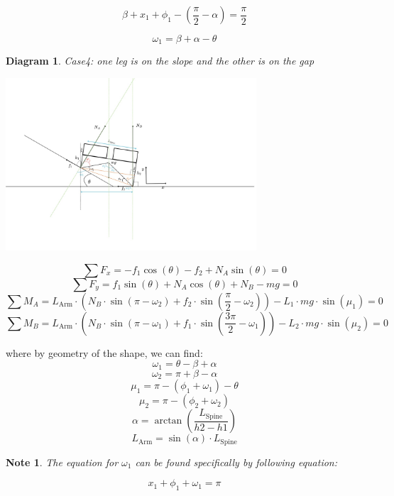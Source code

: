 \documentclass[11pt]{article}
\newtheorem{diagram}[statement]{Diagram}
\newtheorem{note}[statement]{Note}
\begin{document}
\begin{equation}
\beta + x_1 + \phi_1 - \left( \frac{\pi}{2} - \alpha \right) = \frac{\pi}{2}
\end{equation}

\begin{equation}
\omega_1 = \beta + \alpha - \theta
\tag*{From (1) and (2)}
\end{equation}

\begin{diagram}
    Case4: one leg is on the slope and the other is on the gap
\end{diagram}
\vspace{1ex} %
\begin{center}
    \includegraphics[width=0.7\textwidth]{figs/Case4.jpg} %
\end{center}

\[ \sum F_x = -f_1 \cos(\theta) -f_2 + N_A \sin(\theta)= 0 \]
\[ \sum F_y = f_1 \sin(\theta)+ N_A \cos(\theta) + N_B - mg = 0 \]
\[ \sum M_A =  L_\text{Arm} \cdot (N_B \cdot \sin(\pi-\omega_2) + f_2 \cdot \sin(\frac{\pi}{2}-\omega_2)) - L_1\cdot mg \cdot \sin(\mu_1)= 0 \]
\[ \sum M_B =  L_\text{Arm} \cdot (N_B \cdot \sin(\pi-\omega_1) + f_1 \cdot \sin(\frac{3\pi}{2}-\omega_1)) - L_2\cdot mg \cdot \sin(\mu_2)= 0 \]

where by geometry of the shape, we can find:
\[\omega_1 = \theta - \beta + \alpha\]
\[\omega_2 =  \pi + \beta - \alpha \]
\[\mu_1 = \pi-(\phi_1+\omega_1)-\theta \]
\[\mu_2 = \pi-(\phi_2+\omega_2) \]
\[\alpha = \arctan(\frac{L_\text{Spine}}{h2-h1}) \]
\[L_\text{Arm} = \sin(\alpha) \cdot L_\text{Spine}\]

\begin{note}
The equation for \(\omega_1\)  can be found specifically by following equation:
\end{note}
\begin{equation}
x_1 + \phi_1 + \omega_1 = \pi
\end{equation}
\end{document}
